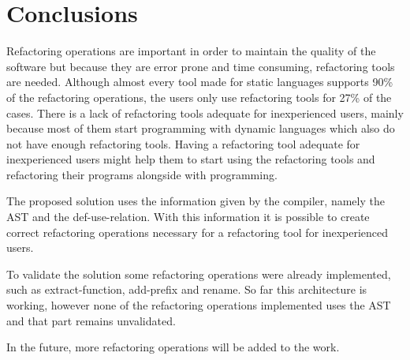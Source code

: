 
% 
% 

\section{Conclusions}


Refactoring operations are important in order to maintain the quality of the software but because they are error prone and time consuming, refactoring tools are needed.
Although almost every tool made for static languages supports 90\% of the refactoring operations, the users only use refactoring tools for 27\% of the cases. 
There is a lack of refactoring tools adequate for inexperienced users, mainly because most of them start programming with dynamic languages which also do not have enough refactoring tools.
Having a refactoring tool adequate for inexperienced users might help them to start using the refactoring tools and refactoring their programs alongside with programming.

The proposed solution uses the information given by the compiler, namely the AST and the def-use-relation. With this information it is possible to create correct refactoring operations necessary for a refactoring tool for inexperienced users.


To validate the solution some refactoring operations were already implemented, such as extract-function, add-prefix and rename. 
So far this architecture is working, however none of the refactoring operations implemented uses the AST and that part remains unvalidated.

In the future, more refactoring operations will be added to the work.







